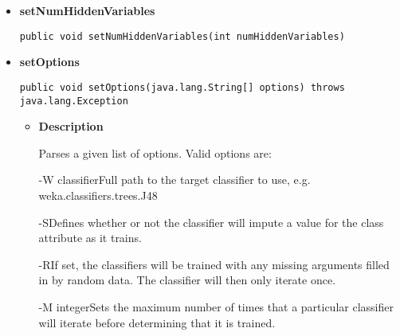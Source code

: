 \documentclass[11pt,a4paper]{report}
\begin{document}
{{{{{\begin{itemize}
{\begin{itemize}
{Set the value of m\_MaxIterations. Defaults to Integer.MAX\_VALUE if value less than 0 is supplied.
}
\item{
{\bf  Parameters}
  \begin{itemize}
   \item{
\texttt{maxIterations} -- new value of m\_MaxIterations}
  \end{itemize}
}%
\end{itemize}
}%
\item{ 
{\bf  setNumHiddenVariables}\\
\begin{lstlisting}[frame=none]
public void setNumHiddenVariables(int numHiddenVariables)\end{lstlisting} %
}%
\item{ 
{\bf  setOptions}\\
\begin{lstlisting}[frame=none]
public void setOptions(java.lang.String[] options) throws java.lang.Exception\end{lstlisting} %
\begin{itemize}
\item{
{\bf  Description}

Parses a given list of options. Valid options are:

-W classifier\mbox{}\newline Full path to the target classifier to use, e.g. weka.classifiers.trees.J48

-S\mbox{}\newline Defines whether or not the classifier will impute a value for the class attribute as it trains.

-R\mbox{}\newline If set, the classifiers will be trained with any missing arguments filled in by random data. The classifier will then only iterate once.

-M integer\mbox{}\newline Sets the maximum number of times that a particular classifier will iterate before determining that it is trained.

}
\end{itemize}}
\end{itemize}}}}}}
\end{document}

